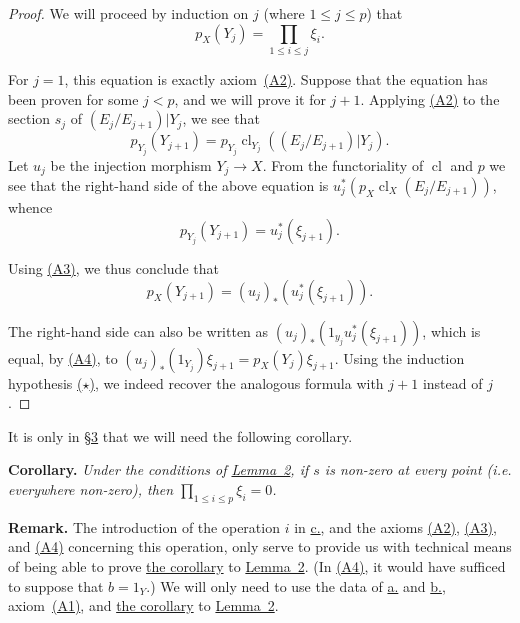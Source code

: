 \documentclass{article}
\newenvironment{itenv}[1]
  {\phantomsection\par\medskip\noindent\textbf{#1.}\itshape}
  {\medskip}
\newenvironment{rmenv}[1]
  {\phantomsection\par\medskip\noindent\textbf{#1.}\rmfamily}
  {\medskip}
\renewcommand{\leq}{\leqslant}
\DeclareMathOperator{\cl}{cl}
\newcommand{\oldpage}[1]{\marginpar{\footnotesize$\Big\vert$ \textit{p.~#1}}}
\begin{document}
\begin{proof}
  We will proceed by induction on $j$ (where $1\leq j\leq p$) that
  \[
    \label{lemma2equationstar}
    p_X(Y_j) = \prod_{1\leq i\leq j}\xi_i.
    \tag{$\star$}
  \]

  For $j=1$, this equation is exactly axiom~\hyperref[axiomA2]{(A2)}.
  Suppose that the equation has been proven for some $j<p$, and we will prove it for $j+1$.
  Applying \hyperref[axiomA2]{(A2)} to the section $s_j$ of $(E_j/E_{j+1})|Y_j$, we see that
  \[
    p_{Y_j}(Y_{j+1}) = p_{Y_j}\cl_{Y_j}((E_j/E_{j+1})|Y_j).
  \]
  Let $u_j$ be the injection morphism $Y_j\to X$.
  From the functoriality of $\cl$ and $p$ we see that the right-hand side of the above equation is $u_j^*(p_X\cl_X(E_j/E_{j+1}))$, whence
  \[
    p_{Y_j}(Y_{j+1}) = u_j^*(\xi_{j+1}).
  \]

  \oldpage{142}
  Using \hyperref[axiomA3]{(A3)}, we thus conclude that
  \[
    p_X(Y_{j+1}) = (u_j)_*(u_j^*(\xi_{j+1})).
  \]

  The right-hand side can also be written as $(u_j)_*(1_{y_j}u_j^*(\xi_{j+1}))$, which is equal, by \hyperref[axiomA4]{(A4)}, to $(u_j)_*(1_{Y_j})\xi_{j+1} = p_X(Y_j)\xi_{j+1}$.
  Using the induction hypothesis \hyperref[lemma2equationstar]{($\star$)}, we indeed recover the analogous formula with $j+1$ instead of $j$.
\end{proof}

It is only in \hyperref[section3]{\S3} that we will need the following corollary.
\begin{itenv}{Corollary}
\label{lemma2corollary}
  Under the conditions of \hyperref[lemma2]{Lemma~2}, if $s$ is non-zero at every point (i.e. everywhere non-zero), then $\prod_{1\leq i\leq p}\xi_i=0$.
\end{itenv}

\begin{rmenv}{Remark}
  The introduction of the operation $i$ in \hyperref[datac]{c.}, and the axioms \hyperref[axiomA2]{(A2)}, \hyperref[axiomA3]{(A3)}, and \hyperref[axiomA4]{(A4)} concerning this operation, only serve to provide us with technical means of being able to prove \hyperref[lemma2corollary]{the corollary} to \hyperref[lemma2]{Lemma~2}.
  (In \hyperref[axiomA4]{(A4)}, it would have sufficed to suppose that $b=1_Y$.)
  We will only need to use the data of \hyperref[dataa]{a.} and \hyperref[datab]{b.}, axiom~\hyperref[axiomA2]{(A1)}, and \hyperref[lemma2corollary]{the corollary} to \hyperref[lemma2]{Lemma~2}.
\end{rmenv}
\end{document}
